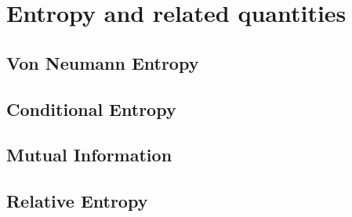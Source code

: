 \section{Entropy and related quantities}

\subsection{Von Neumann Entropy}

\subsection{Conditional Entropy}

\subsection{Mutual Information}

\subsection{Relative Entropy}